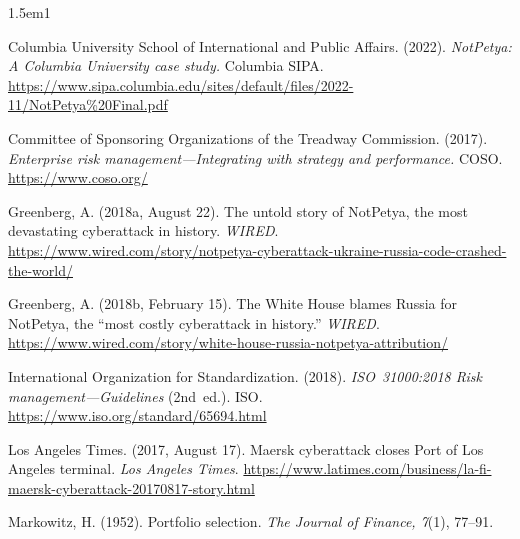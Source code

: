 \documentclass[11pt,openany]{book}
\begin{document}
\begin{hangparas}{1.5em}{1}

Columbia University School of International and Public Affairs. (2022).
\emph{NotPetya: A Columbia University case study.} Columbia SIPA.
\url{https://www.sipa.columbia.edu/sites/default/files/2022-11/NotPetya%20Final.pdf}

Committee of Sponsoring Organizations of the Treadway Commission. (2017).
\emph{Enterprise risk management---Integrating with strategy and performance.}
COSO. \url{https://www.coso.org/}

Greenberg, A. (2018a, August 22). The untold story of NotPetya, the most
devastating cyberattack in history. \emph{WIRED}.
\url{https://www.wired.com/story/notpetya-cyberattack-ukraine-russia-code-crashed-the-world/}

Greenberg, A. (2018b, February 15). The White House blames Russia for
NotPetya, the ``most costly cyberattack in history.'' \emph{WIRED}.
\url{https://www.wired.com/story/white-house-russia-notpetya-attribution/}

International Organization for Standardization. (2018). \emph{ISO~31000:2018
Risk management---Guidelines} (2nd~ed.). ISO.
\url{https://www.iso.org/standard/65694.html}

Los Angeles Times. (2017, August 17). Maersk cyberattack closes Port of Los
Angeles terminal. \emph{Los Angeles Times}.
\url{https://www.latimes.com/business/la-fi-maersk-cyberattack-20170817-story.html}

Markowitz, H. (1952). Portfolio selection. \emph{The Journal of Finance,
7}(1), 77--91.

\end{hangparas}

\endgroup
\end{document}
